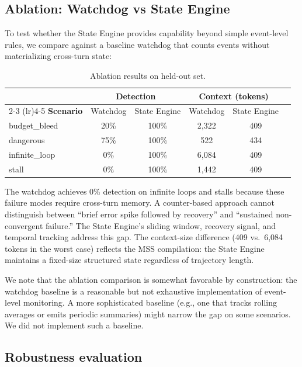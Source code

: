 \documentclass[11pt,a4paper]{article}
\begin{document}
\subsection{Ablation: Watchdog vs State Engine}

To test whether the State Engine provides capability beyond simple event-level rules, we compare against a baseline watchdog that counts events without materializing cross-turn state:

\begin{table}[H]
\centering
\small
\begin{tabular}{lccccc}
\toprule
 & \multicolumn{2}{c}{\textbf{Detection}} & \multicolumn{2}{c}{\textbf{Context (tokens)}} \\
\cmidrule(lr){2-3} \cmidrule(lr){4-5}
\textbf{Scenario} & Watchdog & State Engine & Watchdog & State Engine \\
\midrule
budget\_bleed & 20\% & 100\% & 2,322 & 409 \\
dangerous & 75\% & 100\% & 522 & 434 \\
infinite\_loop & 0\% & 100\% & 6,084 & 409 \\
stall & 0\% & 100\% & 1,442 & 409 \\
\bottomrule
\end{tabular}
\caption{Ablation results on held-out set.}
\end{table}

The watchdog achieves 0\% detection on infinite loops and stalls because these failure modes require cross-turn memory. A counter-based approach cannot distinguish between ``brief error spike followed by recovery'' and ``sustained non-convergent failure.'' The State Engine's sliding window, recovery signal, and temporal tracking address this gap. The context-size difference (409 vs.~6,084 tokens in the worst case) reflects the MSS compilation: the State Engine maintains a fixed-size structured state regardless of trajectory length.

We note that the ablation comparison is somewhat favorable by construction: the watchdog baseline is a reasonable but not exhaustive implementation of event-level monitoring. A more sophisticated baseline (e.g., one that tracks rolling averages or emits periodic summaries) might narrow the gap on some scenarios. We did not implement such a baseline.

\subsection{Robustness evaluation}
\end{document}
